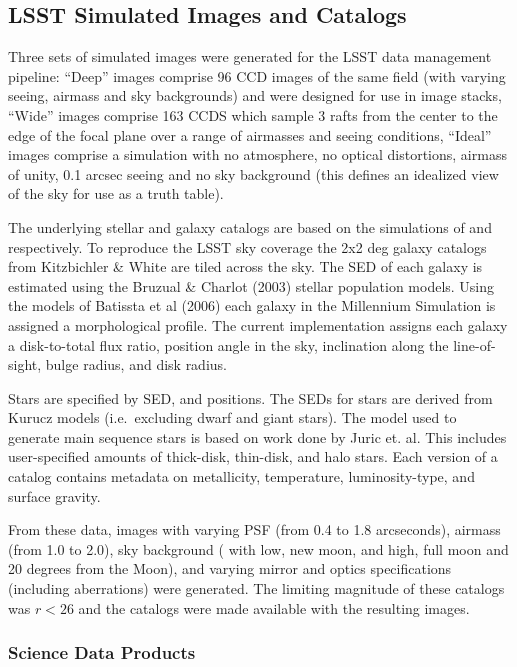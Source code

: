 \subsection{LSST Simulated Images and Catalogs}

Three sets of simulated images were generated for the LSST data
management pipeline: ``Deep'' images comprise 96 CCD images of the
same field (with varying seeing, airmass and sky backgrounds) and were
designed for use in image stacks, ``Wide'' images comprise 163 CCDS
which sample 3 rafts from the center to the edge of the focal plane
over a range of airmasses and seeing conditions, ``Ideal'' images
comprise a simulation with no atmosphere, no optical distortions,
airmass of unity, 0.1 arcsec seeing and no sky background (this
defines an idealized view of the sky for use as a truth table).

The underlying stellar and galaxy catalogs are based on the
simulations of \cite{Juric+Ivesic} and \cite{kitzbischler}
respectively.  To reproduce the LSST sky coverage the 2x2 deg galaxy
catalogs from Kitzbichler \& White are tiled across the sky.  The SED
of each galaxy is estimated using the Bruzual \& Charlot (2003) stellar
population models. Using the models of Batissta et al (2006) each
galaxy in the Millennium Simulation is assigned a morphological
profile. The current implementation assigns each galaxy a
disk-to-total flux ratio, position angle in the sky, inclination along
the line-of-sight, bulge radius, and disk radius.

Stars are specified by SED, and positions. The SEDs for stars are
derived from Kurucz models (i.e.\ excluding dwarf and giant
stars). The model used to generate main sequence stars is based on
work done by Juric et. al. This includes user-specified amounts of
thick-disk, thin-disk, and halo stars. Each version of a catalog
contains metadata on metallicity, temperature, luminosity-type, and
surface gravity.

From these data, images with varying PSF (from 0.4 to 1.8 arcseconds),
airmass (from 1.0 to 2.0), sky background ( with low, new moon, and
high, full moon and 20 degrees from the Moon), and varying mirror and
optics specifications (including aberrations) were generated.  The
limiting magnitude of these catalogs was $r<26$ and the catalogs were
made available with the resulting images.

\subsubsection{Science Data Products}

